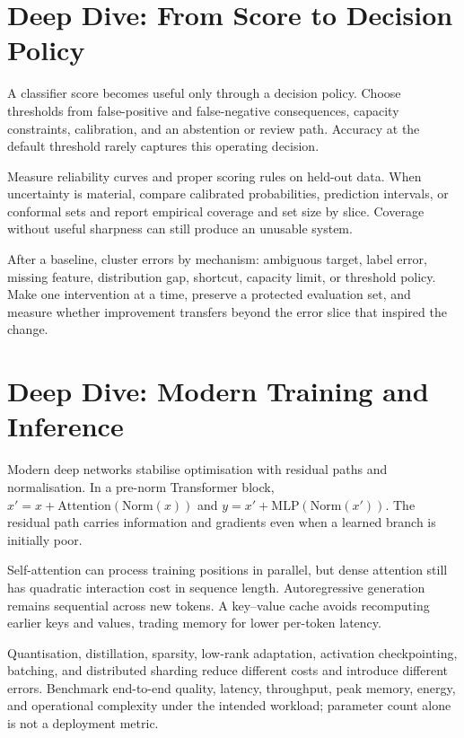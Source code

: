 \expandafter\def\csname almanachdeepdive@machine-learning\endcsname{%
\section{Deep Dive: From Score to Decision Policy}
\begin{tcbitemize}[skin=sectionraster]
\tcbitem[title={Probability, Threshold, Action},raster multicolumn=3]
A classifier score becomes useful only through a decision policy.
Choose thresholds from false-positive and false-negative consequences,
capacity constraints, calibration, and an abstention or review path.
Accuracy at the default threshold rarely captures this operating decision.

\tcbitem[title={Calibration and Coverage},raster multicolumn=3]
Measure reliability curves and proper scoring rules on held-out data.
When uncertainty is material, compare calibrated probabilities, prediction
intervals, or conformal sets and report empirical coverage and set size by
slice.
Coverage without useful sharpness can still produce an unusable system.

\tcbitem[title={Data-Centric Error Loop},raster multicolumn=6]
After a baseline, cluster errors by mechanism: ambiguous target, label error,
missing feature, distribution gap, shortcut, capacity limit, or threshold
policy.
Make one intervention at a time, preserve a protected evaluation set, and
measure whether improvement transfers beyond the error slice that inspired the
change.
\end{tcbitemize}
}

\expandafter\def\csname almanachdeepdive@deep-learning\endcsname{%
\section{Deep Dive: Modern Training and Inference}
\begin{tcbitemize}[skin=sectionraster]
\tcbitem[title={Residual Pre-Norm Blocks},raster multicolumn=3]
Modern deep networks stabilise optimisation with residual paths and
normalisation.
In a pre-norm Transformer block,
$x' = x + \mathrm{Attention}(\mathrm{Norm}(x))$ and
$y = x' + \mathrm{MLP}(\mathrm{Norm}(x'))$.
The residual path carries information and gradients even when a learned branch
is initially poor.

\tcbitem[title={Training Parallelism vs Inference},raster multicolumn=3]
Self-attention can process training positions in parallel, but dense attention
still has quadratic interaction cost in sequence length.
Autoregressive generation remains sequential across new tokens.
A key--value cache avoids recomputing earlier keys and values, trading memory
for lower per-token latency.

\tcbitem[title={Efficiency Is Multi-Dimensional},raster multicolumn=6]
Quantisation, distillation, sparsity, low-rank adaptation, activation
checkpointing, batching, and distributed sharding reduce different costs and
introduce different errors.
Benchmark end-to-end quality, latency, throughput, peak memory, energy, and
operational complexity under the intended workload; parameter count alone is
not a deployment metric.
\end{tcbitemize}
}

